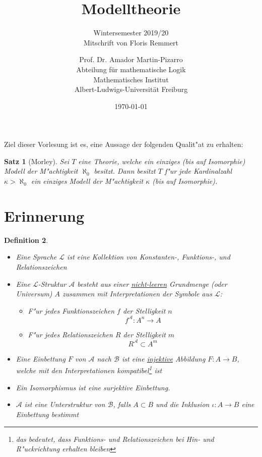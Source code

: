 \documentclass[a4paper,12pt,numbers=noenddot,parskip=full]{scrartcl}
\title{Modelltheorie}
\subtitle{Wintersemester 2019/20 \\ Mitschrift von Floris Remmert}
\author{Prof. Dr. Amador Martin-Pizarro\\Abteilung für mathematische Logik\\Mathematisches Institut\\Albert-Ludwigs-Universität Freiburg}
\date{\today}
\newcommand{\scrL}{\mathcal{L}}
\newcommand{\scrA}{\mathcal{A}}
\newcommand{\scrB}{\mathcal{B}}
\theoremstyle{dotless}
\newtheorem{theorem}{Satz}[section]
\newtheorem{definition}[theorem]{Definition}
\theoremstyle{remark}
\begin{document}
	\pagestyle{headings}
\begin{titlepage}
	\maketitle	
	\thispagestyle{empty}
\end{titlepage}
\newpage 
\thispagestyle{empty}
\quad 
\newpage
\tableofcontents 
\thispagestyle{empty}

\newpage
\setcounter{page}{1}
Ziel dieser Vorlesung ist es, eine Aussage der folgenden Qualit"at zu erhalten:
\begin{theorem}[Morley]
	Sei $T$ eine Theorie, welche ein einziges (bis auf Isomorphie) Modell der M"achtigkeit $\aleph_0$ besitzt. Dann besitzt $T$ f"ur jede Kardinalzahl $\kappa > \aleph_0$ ein einziges Modell der M"achtigkeit $\kappa$ (bis auf Isomorphie).
\end{theorem}

\section{Erinnerung}
\begin{definition}
	\begin{itemize}
		\item Eine Sprache $\scrL$ ist eine Kollektion von Konstanten-, Funktions-, und Relationszeichen
		\item Eine $\scrL$-Struktur $\scrA$ besteht aus einer \underline{nicht-leeren} Grundmenge (oder Universum) $A$ zusammen mit Interpretationen der Symbole aus $\scrL$:
		\begin{itemize}
			\item F"ur jedes Funktionszeichen $f$ der Stelligkeit $n$ 
			\begin{equation*}
				f^\scrA : A^n \longrightarrow A
			\end{equation*}
			\item F"ur jedes Relationszeichen $R$ der Stelligkeit $m$
			\begin{equation*}
				R^\scrA \subset A^m
			\end{equation*}
		\end{itemize}
	\item Eine Einbettung $F$ von $\scrA$ nach $\scrB$ ist eine \underline{injektive} Abbildung $F: A \longrightarrow B$, welche mit den Interpretationen kompatibel\footnote{das bedeutet, dass Funktions- und Relationszeichen bei Hin- und R"uckrichtung erhalten bleiben} ist
	\item Ein Isomorphismus ist eine surjektive Einbettung.
	\item $\scrA$ ist eine Unterstruktur von $\scrB$, falls $A \subset B$ und die Inklusion $\iota : A \longrightarrow B$ eine Einbettung bestimmt
	\end{itemize}
\end{definition}
\end{document}
